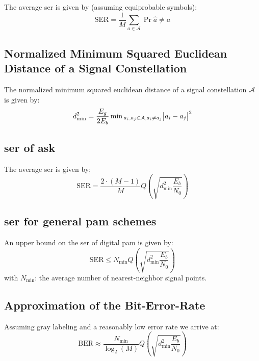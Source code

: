 The average \ac{ser} is given by (assuming equiprobable symbols):
\begin{equation}
    \text{SER} = \frac{1}{M} \sum_{a \in \mathcal{A}} \Pr{\hat{a} \neq a}
\end{equation}

\subsection{Normalized Minimum Squared Euclidean Distance of a Signal Constellation}
The normalized minimum squared euclidean distance of a signal constellation
$\mathcal{A}$ is given by:
\begin{equation}
    d_\text{min}^2 = \frac{E_g}{2 E_b} \min{}_{a_i, a_j \in \mathcal{A}, a_i \neq a_j}
        \abs{a_i - a_j}^2
\end{equation}

\subsection{\acl{ser} of \acl{ask}}
The average \ac{ser} is given by;
\begin{equation}
    \text{SER} = 
        \frac{2 \cdot (M-1)}{M} Q\left(\sqrt{d_\text{min}^2 \frac{E_b}{N_0}}\right)
\end{equation}

\subsection{\acl{ser} for general \acl{pam} schemes}
An upper bound on the \ac{ser} of digital \ac{pam} is given by:
\begin{equation}
    \text{SER} \leq N_\text{min} Q\left(\sqrt{d_\text{min}^2 \frac{E_b}{N_0}}\right)
\end{equation}
with $N_\text{min}$: the average number of nearest-neighbor signal points.

\subsection{Approximation of the Bit-Error-Rate}
Assuming gray labeling and a reasonably low error rate we arrive at:
\begin{equation}
    \text{BER} \approx \frac{N_\text{min}}{\log_2(M)} Q\left(\sqrt{d_\text{min}^2 \frac{E_b}{N_0}}\right)
\end{equation}

